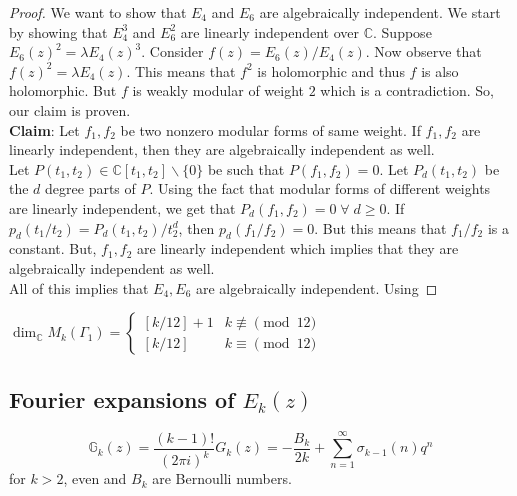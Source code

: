 \documentclass[oneside, 12pt]{scrbook}
\newcommand{\CC}{\mathbb C}
\theoremstyle{theorem}
\begin{document}
\begin{proof}
We want to show that $E_{4}$ and $E_{6}$ are algebraically independent. We start by showing that $E_{4}^3$ and $E_{6}^2$ are linearly independent over $\CC$. Suppose $E_{6}(z)^2 = \lambda E_{4}(z)^{3}$. Consider $f(z) = E_{6}(z)/ E_{4}(z)$. Now observe that $f(z)^2 = \lambda E_{4}(z)$. This means that $f^2$ is holomorphic and thus $f$ is also holomorphic. But $f$ is weakly modular of weight $2$ which is a contradiction. So, our claim is proven. \\

\textbf{Claim}: Let $f_{1},f_{2}$ be two nonzero modular forms of same weight. If $f_{1},f_{2}$ are linearly independent, then they are algebraically independent as well. \\

Let $P(t_{1},t_{2}) \in \CC[t_{1},t_{2}] \backslash \{0\}$ be such that $P(f_{1},f_{2})=0$. Let $P_{d}(t_{1},t_{2})$ be the $d$ degree parts of $P$. Using the fact that modular forms of different weights are linearly independent, we get that $P_{d}(f_{1},f_{2})=0 \; \forall \; d \geq 0$. If $p_{d}(t_{1}/t_{2}) = P_{d}(t_{1},t_{2})/t_{2}^d$, then $p_{d}(f_{1}/f_{2})=0$. But this means that $f_{1}/f_{2}$ is a constant. But, $f_{1},f_{2}$ are linearly independent which implies that they are algebraically independent as well. \\

All of this implies that $E_{4},E_{6}$ are algebraically independent. Using
\end{proof}

\begin{corollary}
$\dim_{\CC} M_{k} (\Gamma_{1}) = \begin{cases}[k/12]+1 & k\not \equiv \pmod{12} \\ [k/12] & k \equiv \pmod{12} \end{cases} $
\end{corollary}

\subsection{Fourier expansions of $E_{k}(z)$}

\begin{proposition}
$$\mathbb{G}_{k}(z) = \frac{(k-1)!}{(2 \pi i)^k} G_{k}(z) = -\frac{B_{k}}{2k} + \sum_{n=1}^{\infty} \sigma_{k-1}(n)q^n$$ for $k>2$, even and $B_{k}$ are Bernoulli numbers.
\end{proposition}
\end{document}
